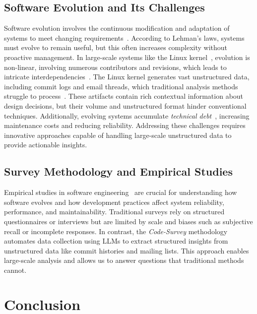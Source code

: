 \documentclass[sigconf,review,anonymous]{acmart}
\begin{document}
\subsection{Software Evolution and Its Challenges}
Software evolution involves the continuous modification and adaptation of systems to meet changing requirements~\cite{lehman1996laws}. According to Lehman's laws, systems must evolve to remain useful, but this often increases complexity without proactive management. In large-scale systems like the Linux kernel~\cite{linux}, evolution is non-linear, involving numerous contributors and revisions, which leads to intricate interdependencies~\cite{israeli2010linux}. The Linux kernel generates vast unstructured data, including commit logs and email threads, which traditional analysis methods struggle to process~\cite{mens2008introduction}. These artifacts contain rich contextual information about design decisions, but their volume and unstructured format hinder conventional techniques. Additionally, evolving systems accumulate \emph{technical debt}~\cite{brown2010managing}, increasing maintenance costs and reducing reliability. Addressing these challenges requires innovative approaches capable of handling large-scale unstructured data to provide actionable insights.



\subsection{Survey Methodology and Empirical Studies}

Empirical studies in software engineering~\cite{perry2000empirical} are crucial for understanding how software evolves and how development practices affect system reliability, performance, and maintainability. Traditional surveys rely on structured questionnaires or interviews but are limited by scale and biases such as subjective recall or incomplete responses. In contrast, the \textit{Code-Survey} methodology automates data collection using LLMs to extract structured insights from unstructured data like commit histories and mailing lists. This approach enables large-scale analysis and allows us to answer questions that traditional methods cannot.






\section{Conclusion}
\end{document}
